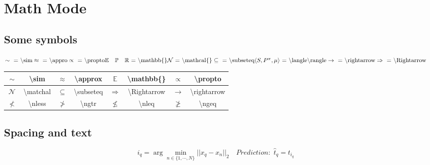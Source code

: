 
\section{Math Mode}

\subsection{Some symbols}
$
\sim\text{ = \textbackslash sim}
\\ 
\approx\text{ = \textbackslash appro}
\\
\propto\text{ = \textbackslash propto}
\\
\mathbb{E} \hspace{1em} \mathbb{P} \hspace{1em} \mathbb{R}\text{ = \textbackslash mathbb\{\}}
\\
\mathcal{N}\text{ = \textbackslash mathcal\{\}}
\\
\subseteq\text{ = \textbackslash subseteq}
\\
\langle S,P^{\pi},\mu\rangle\text{ = \textbackslash langle\textbackslash rangle}
\\ 
\rightarrow\text{ = \textbackslash rightarrow}
\\ 
\Rightarrow\text{ = \textbackslash Rightarrow}
$

\begin{center}
    \begin{tabular}{c c|c c|c c|c c}
        \hline
        $\sim$ & \textbackslash sim
        & $\approx$ & \textbackslash approx 
        & $\mathbb{E}$ & \textbackslash mathbb\{\} 
        & $\propto$ & \textbackslash propto \\ \hline

        $\mathcal{N}$ & \textbackslash matchal 
        & $\subseteq$ & \textbackslash subseteq 
        & $\Rightarrow$ & \textbackslash Rightarrow
        & $\rightarrow$ & \textbackslash rightarrow \\ \hline

        $\nless$ & \textbackslash nless 
        & $\ngtr$ & \textbackslash ngtr 
        & $\nleq$ & \textbackslash nleq 
        & $\ngeq$ & \textbackslash ngeq \\ \hline
    \end{tabular}    
\end{center}


\subsection{Spacing and text}
$$i_q=\arg\min_{n\in\{1,\cdots,N\}}||x_q-x_n||_2\hspace{1em}Prediction:\,\,\hat{t}_q=t_{i_q}$$

